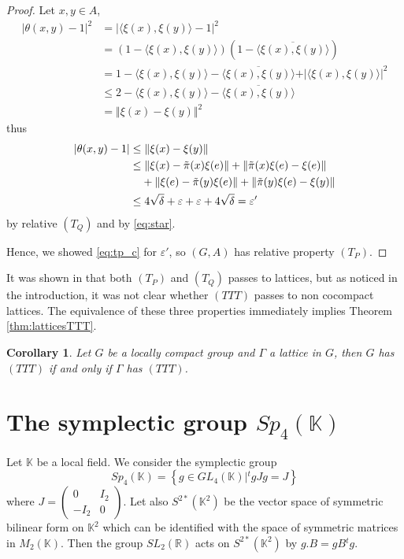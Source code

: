 \documentclass{article}
\newtheorem{coro}[theorem]{Corollary}
\theoremstyle{definition}
\theoremstyle{remark}
\numberwithin{equation}{section}
\newcommand{\R}{\mathbb{R}}
\newcommand{\K}{\mathbb{K}}
\begin{document}
\begin{proof}
Let $x,y\in A$, \begin{align*}
   \vert \theta(x,y)-1\vert^2  & =  \vert \langle \xi(x),\xi(y)\rangle -1\vert^2  \\
     & =  (1-\langle \xi(x),\xi(y)\rangle)(1-\overline{\langle \xi(x),\xi(y)\rangle})\\
     & =  1-\langle \xi(x),\xi(y)\rangle-\overline{\langle \xi(x),\xi(y)\rangle}+ \vert \langle \xi(x),\xi(y)\rangle\vert^2\\
     & \leq  2-\langle \xi(x),\xi(y)\rangle-\overline{\langle \xi(x),\xi(y)\rangle} \\
     & =  \Vert \xi(x)-\xi(y)\Vert^2
\end{align*}
thus \begin{align*}
    \vert \theta(x,y)-1\vert & \leq  \Vert \xi(x)-\xi(y)\Vert\\
     & \leq  \Vert \xi(x)-\Tilde{\pi}(x)\xi(e)\Vert + \Vert\Tilde{\pi}(x)\xi(e)-\xi(e)\Vert\\
     &\phantom{{}\leq}+\Vert \xi(e)-\Tilde{\pi}(y)\xi(e)\Vert+\Vert \Tilde{\pi}(y)\xi(e)-\xi(y)\Vert\\
     & \leq  4\sqrt{\delta}+\varepsilon+\varepsilon+4\sqrt{\delta}=\varepsilon'
\end{align*} by relative $(T_Q)$ and by \eqref{eq:star}.\medskip

Hence, we showed \eqref{eq:tp_c} for $\varepsilon'$, so $(G,A)$ has relative property $(T_P)$.
\end{proof}

It was shown in \cite{Ozawa+2011+89+104} that both $(T_P)$ and $(T_Q)$ passes to lattices, but as noticed in the introduction, it was not clear whether $(TTT)$ passes to non cocompact lattices. The equivalence of these three properties immediately implies Theorem \ref{thm:latticesTTT}.

\begin{coro}
    Let $G$ be a locally compact group and $\Gamma$ a lattice in $G$, then $G$ has $(TTT)$ if and only if $\Gamma$ has $(TTT)$.
\end{coro}

\section{The symplectic group \texorpdfstring{$Sp_4(\K)$}{Sp4(K)}}
Let $\K$ be a local field. We consider the symplectic group $$Sp_4(\K)=\left\lbrace g\in GL_4(\K) \vert {}^tgJg=J\right\rbrace$$ where $J=\begin{pmatrix}
    0 & I_2 \\ -I_2 & 0
\end{pmatrix}$. Let also $S^{2*}(\K^2)$ be the vector space of symmetric bilinear form on $\K^2$ which can be identified with the space of symmetric matrices in $M_2(\K)$. Then the group $SL_2(\R)$ acts on $S^{2*}(\K^2)$ by $g.B=gB{}^tg$.\medskip
\end{document}
